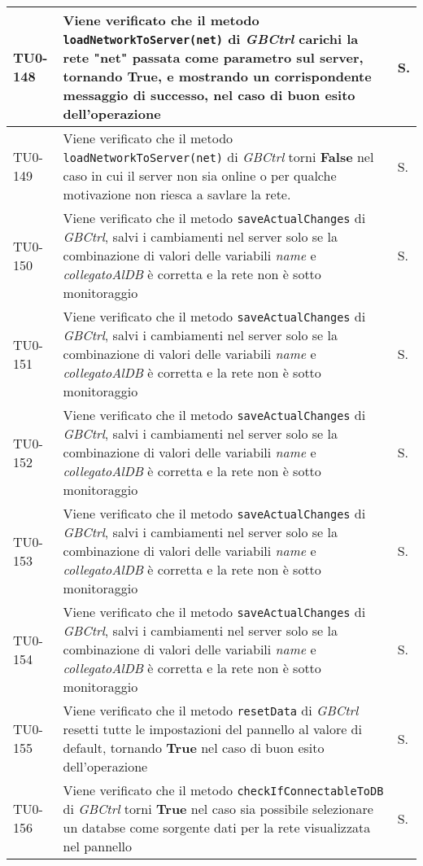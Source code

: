 \begin{longtable}{|C{.15\textwidth}|m{.66\textwidth}|C{.10\textwidth}|}
\hline
TU0-148 & Viene verificato che il metodo \texttt{loadNetworkToServer(net)} di \textit{GBCtrl} carichi la rete "net" passata come parametro sul server, tornando \textbf{True}, e mostrando un corrispondente messaggio di successo, nel caso di buon esito dell'operazione & S.\\
\hline
{}TU0-149 & Viene verificato che il metodo \texttt{loadNetworkToServer(net)} di \textit{GBCtrl} torni \textbf{False} nel caso in cui il server non sia online o per qualche motivazione non riesca a savlare la rete. & S.\\
\hline
TU0-150 & Viene verificato che il metodo \texttt{saveActualChanges} di \textit{GBCtrl}, salvi i cambiamenti nel server solo se la combinazione di valori delle variabili \textit{name} e \textit{collegatoAlDB} è corretta e la rete non è sotto monitoraggio & S.\\
\hline
{}TU0-151 & Viene verificato che il metodo \texttt{saveActualChanges} di \textit{GBCtrl}, salvi i cambiamenti nel server solo se la combinazione di valori delle variabili \textit{name} e \textit{collegatoAlDB} è corretta e la rete non è sotto monitoraggio  & S.\\
\hline
TU0-152 & Viene verificato che il metodo \texttt{saveActualChanges} di \textit{GBCtrl}, salvi i cambiamenti nel server solo se la combinazione di valori delle variabili \textit{name} e \textit{collegatoAlDB} è corretta e la rete non è sotto monitoraggio  & S.\\
\hline
{}TU0-153 & Viene verificato che il metodo \texttt{saveActualChanges} di \textit{GBCtrl}, salvi i cambiamenti nel server solo se la combinazione di valori delle variabili \textit{name} e \textit{collegatoAlDB} è corretta e la rete non è sotto monitoraggio  & S.\\
\hline
TU0-154 & Viene verificato che il metodo \texttt{saveActualChanges} di \textit{GBCtrl}, salvi i cambiamenti nel server solo se la combinazione di valori delle variabili \textit{name} e \textit{collegatoAlDB} è corretta e la rete non è sotto monitoraggio  & S.\\
\hline
{}TU0-155 & Viene verificato che il metodo \texttt{resetData} di \textit{GBCtrl} resetti tutte le impostazioni del pannello al valore di default, tornando \textbf{True} nel caso di buon esito dell'operazione & S.\\
\hline
TU0-156 & Viene verificato che il metodo \texttt{checkIfConnectableToDB} di \textit{GBCtrl} torni \textbf{True} nel caso sia possibile selezionare un databse come sorgente dati per la rete visualizzata nel pannello & S.\\

\end{longtable}
